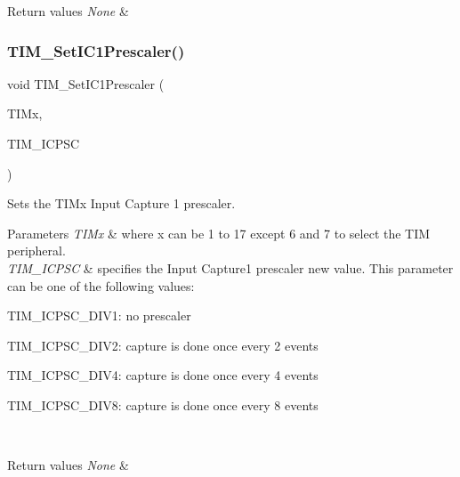 \begin{DoxyRetVals}{Return values}
{\em None} & \\
\hline
\end{DoxyRetVals}
\mbox{\label{group___t_i_m___private___functions_gaf0f684dea88e222de9689d8ed0ca8805}} 
\subsubsection{\texorpdfstring{TIM\_SetIC1Prescaler()}{TIM\_SetIC1Prescaler()}}
{\footnotesize\ttfamily void T\+I\+M\+\_\+\+Set\+I\+C1\+Prescaler (\begin{DoxyParamCaption}\item[{\mbox{\hyperlink{struct_t_i_m___type_def}{T\+I\+M\+\_\+\+Type\+Def}} $\ast$}]{T\+I\+Mx,  }\item[{uint16\+\_\+t}]{T\+I\+M\+\_\+\+I\+C\+P\+SC }\end{DoxyParamCaption})}



Sets the T\+I\+Mx Input Capture 1 prescaler. 


\begin{DoxyParams}{Parameters}
{\em T\+I\+Mx} & where x can be 1 to 17 except 6 and 7 to select the T\+IM peripheral. \\
\hline
{\em T\+I\+M\+\_\+\+I\+C\+P\+SC} & specifies the Input Capture1 prescaler new value. This parameter can be one of the following values\+: \begin{DoxyItemize}
\item T\+I\+M\+\_\+\+I\+C\+P\+S\+C\+\_\+\+D\+I\+V1\+: no prescaler \item T\+I\+M\+\_\+\+I\+C\+P\+S\+C\+\_\+\+D\+I\+V2\+: capture is done once every 2 events \item T\+I\+M\+\_\+\+I\+C\+P\+S\+C\+\_\+\+D\+I\+V4\+: capture is done once every 4 events \item T\+I\+M\+\_\+\+I\+C\+P\+S\+C\+\_\+\+D\+I\+V8\+: capture is done once every 8 events \end{DoxyItemize}
\\
\hline
\end{DoxyParams}

\begin{DoxyRetVals}{Return values}
{\em None} & \\
\hline
\end{DoxyRetVals}
\mbox{\label{group___t_i_m___private___functions_ga3cc4869b5fe73271808512c89322a325}} 
